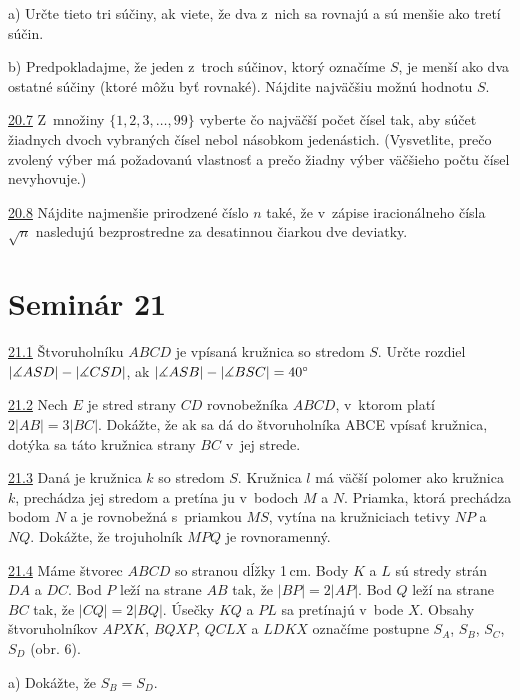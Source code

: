 a) Určte tieto tri súčiny, ak viete, že dva z~nich sa rovnajú a sú menšie ako tretí súčin.

b) Predpokladajme, že jeden z~troch súčinov, ktorý označíme $S$, je menší ako dva ostatné súčiny (ktoré môžu byť rovnaké). Nájdite najväčšiu možnú hodnotu $S$.




\noindent \ul{20.7}  Z~množiny $\{1, 2, 3, \ldots, 99\}$ vyberte čo najväčší počet čísel tak, aby súčet žiadnych dvoch vybraných čísel nebol násobkom jedenástich. (Vysvetlite, prečo zvolený výber má požadovanú vlastnosť a prečo žiadny výber väčšieho počtu čísel nevyhovuje.)




\noindent \ul{20.8} 
Nájdite najmenšie prirodzené číslo $n$ také, že v~zápise iracionálneho čísla $\sqrt{n}$ nasledujú bezprostredne za desatinnou čiarkou dve deviatky.




\section*{Seminár 21}

\noindent \ul{21.1}  Štvoruholníku $ABCD$ je vpísaná kružnica so stredom $S$. Určte rozdiel $|\measuredangle ASD|- |\measuredangle CSD|$, ak $|\measuredangle ASB| - |\measuredangle BSC| = 40^\circ$




\noindent \ul{21.2}  Nech $E$ je stred strany $CD$ rovnobežníka $ABCD$, v~ktorom platí $2|AB| = 3|BC|$. Dokážte, že ak sa dá do štvoruholníka ABCE vpísať kružnica, dotýka sa táto kružnica strany $BC$ v~jej strede.




\noindent \ul{21.3}   Daná je kružnica $k$ so stredom $S$. Kružnica $l$ má väčší polomer ako kružnica $k$, prechádza jej stredom a pretína ju v~bodoch $M$ a $N$. Priamka, ktorá prechádza bodom $N$ a je rovnobežná s~priamkou $MS$, vytína na kružniciach tetivy $NP$ a $NQ$. Dokážte, že trojuholník $MPQ$ je rovnoramenný.




\noindent \ul{21.4}   Máme štvorec $ABCD$ so stranou dĺžky 1\,cm. Body $K$ a $L$ sú stredy strán $DA$ a $DC$. Bod $P$ leží na strane $AB$ tak, že $| BP | = 2 | AP |$. Bod $Q$ leží na strane $BC$ tak, že $| CQ | = 2 | BQ |$. Úsečky $KQ$ a $PL$ sa pretínajú v~bode $X$. Obsahy štvoruholníkov $APXK$, $BQXP$, $QCLX$ a $LDKX$ označíme postupne $S_A$, $S_B$, $S_C$, $S_D$ (obr. 6).

a) Dokážte, že $S_B = S_D$.


